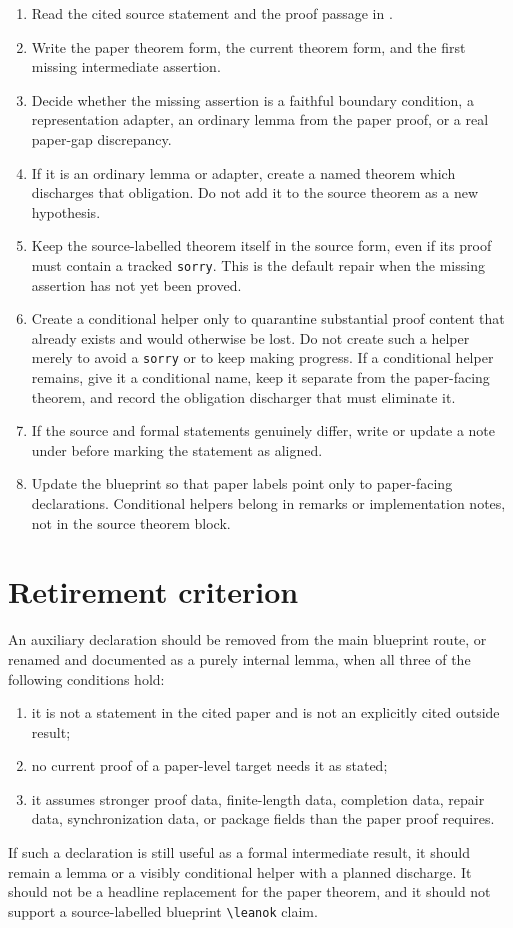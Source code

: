 \documentclass[11pt]{article}
\begin{document}
\begin{enumerate}
  \item Read the cited source statement and the proof passage in
  .
  \item Write the paper theorem form, the current \Lean{} theorem form, and the
  first missing intermediate assertion.
  \item Decide whether the missing assertion is a faithful boundary condition,
  a representation adapter, an ordinary lemma from the paper proof, or a real
  paper-gap discrepancy.
  \item If it is an ordinary lemma or adapter, create a named theorem which
  discharges that obligation.  Do not add it to the source theorem as a new
  hypothesis.
  \item Keep the source-labelled theorem itself in the source form, even if its
  proof must contain a tracked \verb|sorry|.  This is the default repair when
  the missing assertion has not yet been proved.
  \item Create a conditional helper only to quarantine substantial proof content
  that already exists and would otherwise be lost.  Do not create such a helper
  merely to avoid a \verb|sorry| or to keep making progress.  If a conditional
  helper remains, give it a conditional name, keep it separate from the
  paper-facing theorem, and record the obligation discharger that must eliminate
  it.
  \item If the source and formal statements genuinely differ, write or update a
  note under  before marking the statement as aligned.
  \item Update the blueprint so that paper labels point only to paper-facing
  declarations.  Conditional helpers belong in remarks or implementation
  notes, not in the source theorem block.
\end{enumerate}

\section{Retirement criterion}

An auxiliary declaration should be removed from the main blueprint route, or
renamed and documented as a purely internal lemma, when all three of the
following conditions hold:
\begin{enumerate}
  \item it is not a statement in the cited paper and is not an explicitly cited
        outside result;
  \item no current proof of a paper-level target needs it as stated;
  \item it assumes stronger proof data, finite-length data, completion data,
        repair data, synchronization data, or package fields than the paper
        proof requires.
\end{enumerate}
If such a declaration is still useful as a formal intermediate result, it
should remain a lemma or a visibly conditional helper with a planned discharge.
It should not be a headline replacement for the paper theorem, and it should
not support a source-labelled blueprint \verb|\leanok| claim.
\end{document}
